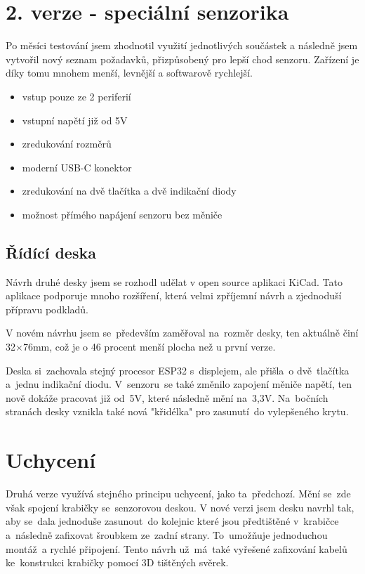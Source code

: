 \section{2. verze - speciální senzorika}

Po měsíci testování jsem zhodnotil využití jednotlivých součástek a následně jsem vytvořil nový seznam požadavků, přizpůsobený pro lepší chod senzoru.
Zařízení je díky tomu mnohem menší, levnější a softwarově rychlejší.

\begin{itemize}
    \item vstup pouze ze 2 periferií
    \item vstupní napětí již od 5V
    \item zredukování rozměrů
    \item moderní USB-C konektor
    \item zredukování na dvě tlačítka a dvě indikační diody
    \item možnost přímého napájení senzoru bez měniče
\end{itemize}

\subsection{Řídící deska}
Návrh druhé desky jsem se rozhodl udělat v open source aplikaci KiCad.
Tato aplikace podporuje mnoho rozšíření, která velmi zpříjemní návrh a zjednoduší přípravu podkladů.

V novém návrhu jsem se~především zaměřoval na~rozměr desky, ten aktuálně činí 32$\times$76mm, což je o 46 procent menší plocha než u první verze.

Deska si~zachovala stejný procesor ESP32 s~displejem, ale přišla~o dvě~tlačítka a~jednu indikační diodu.
V~senzoru~se také změnilo zapojení měniče napětí, ten nově dokáže pracovat již od~5V, které následně mění na~3,3V.
Na~bočních stranách desky vznikla také nová "křidélka" pro zasunutí~do vylepšeného krytu.


\fxnote[author=JA]{\textcolor{mygreen}{Obrázek deksa => krabička}}

\section{Uchycení}
Druhá verze využívá stejného principu uchycení, jako ta~předchozí. 
Mění se~zde však spojení krabičky se~senzorovou deskou. 
V nové verzi jsem desku navrhl tak, aby se~dala jednoduše zasunout~do kolejnic které jsou předtištěné v~krabičce a~následně zafixovat šroubkem ze~zadní strany.
To~umožňuje jednoduchou montáž~a rychlé připojení.
Tento návrh už~má~také vyřešené zafixování kabelů ke~konstrukci krabičky pomocí 3D tištěných svěrek.


